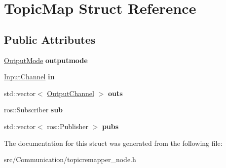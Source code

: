 \hypertarget{structTopicMap}{}\section{Topic\+Map Struct Reference}
\label{structTopicMap}
\subsection*{Public Attributes}
\begin{DoxyCompactItemize}
\item 
\mbox{\label{structTopicMap_af71c49242c175938b8acc3d83d2b697f}} 
\hyperlink{structOutputMode}{Output\+Mode} {\bfseries outputmode}
\item 
\mbox{\label{structTopicMap_a7ae71d657268a994853892b4fa658707}} 
\hyperlink{structInputChannel}{Input\+Channel} {\bfseries in}
\item 
\mbox{\label{structTopicMap_a73200124d064038a03b3c010819cefda}} 
std\+::vector$<$ \hyperlink{structOutputChannel}{Output\+Channel} $>$ {\bfseries outs}
\item 
\mbox{\label{structTopicMap_a9483eab9aea240c555db58c8cd4417c3}} 
ros\+::\+Subscriber {\bfseries sub}
\item 
\mbox{\label{structTopicMap_aa55be958065ef8d07e415e578616b94a}} 
std\+::vector$<$ ros\+::\+Publisher $>$ {\bfseries pubs}
\end{DoxyCompactItemize}


The documentation for this struct was generated from the following file\+:\begin{DoxyCompactItemize}
\item 
src/\+Communication/topicremapper\+\_\+node.\+h\end{DoxyCompactItemize}
